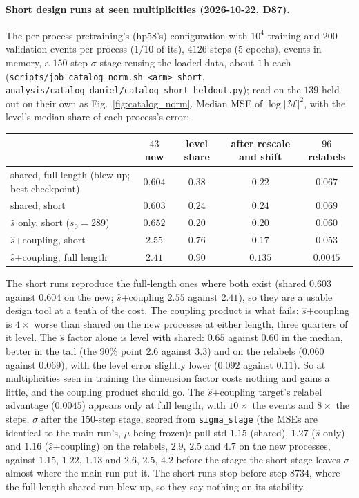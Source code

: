 \documentclass[11pt]{article}
\newcommand{\code}[1]{\texttt{#1}}
\begin{document}
\paragraph{Short design runs at seen multiplicities (2026-10-22, D87).} The per-process pretraining's (hp58's) configuration with $10^4$ training and
$200$ validation events per process ($1/10$ of its), $4126$ steps (5 epochs), events in memory, a $150$-step
$\sigma$ stage reusing the loaded data, about $1$\,h each (\code{scripts/job\_catalog\_norm.sh <arm> short},
\code{analysis/catalog\_daniel/catalog\_short\_heldout.py}); read on the $139$ held-out on their own as
Fig.~\ref{fig:catalog_norm}. Median MSE of $\log|\mathcal M|^2$, with the level's median share of each process's error:
\begin{center}
\begin{tabular}{lcccc}
 & $43$ new & level share & after rescale and shift & $96$ relabels \\ \hline
shared, full length (blew up; best checkpoint) & $0.604$ & $0.38$ & $0.22$ & $0.067$ \\
shared, short & $0.603$ & $0.24$ & $0.24$ & $0.069$ \\
$\hat s$ only, short ($s_0=289$) & $0.652$ & $0.20$ & $0.20$ & $0.060$ \\
$\hat s$+coupling, short & $2.55$ & $0.76$ & $0.17$ & $0.053$ \\
$\hat s$+coupling, full length & $2.41$ & $0.90$ & $0.135$ & $0.0045$ \\
\end{tabular}
\end{center}
The short runs reproduce the full-length ones where both exist (shared $0.603$ against $0.604$ on the new; $\hat s$+coupling $2.55$ against
$2.41$), so they are a usable design tool at a tenth of the cost. The coupling product is what fails: $\hat s$+coupling is $4\times$
worse than shared on the new processes at either length, three quarters of it level. The $\hat s$ factor alone is level
with shared: $0.65$ against $0.60$ in the median, better in the tail (the $90\%$ point $2.6$ against $3.3$) and on the relabels
($0.060$ against $0.069$), with the level error slightly lower ($0.092$ against $0.11$). So at multiplicities seen in
training the dimension factor costs nothing and gains a little, and the coupling product should go. The $\hat s$+coupling target's relabel advantage
($0.0045$) appears only at full length, with $10\times$ the events and $8\times$ the steps. $\sigma$ after the
$150$-step stage, scored from \code{sigma\_stage} (the MSEs are identical to the main run's, $\mu$ being frozen): pull
std $1.15$ (shared), $1.27$ ($\hat s$ only) and $1.16$ ($\hat s$+coupling) on the relabels, $2.9$, $2.5$ and $4.7$ on
the new processes, against $1.15$, $1.22$, $1.13$ and $2.6$, $2.5$, $4.2$ before the stage: the short stage leaves
$\sigma$ almost where the main run put it. The short runs stop before
step $8734$, where the full-length shared run blew up, so they say nothing on its stability.
\end{document}
